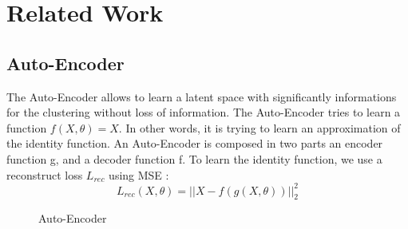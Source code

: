 \section{Related Work}\label{sec:related}

\subsection{Auto-Encoder}
The Auto-Encoder allows to learn a latent space with significantly
informations for the clustering without loss of information.
The Auto-Encoder tries to learn a function $f (X, \theta) = X$. In
other words, it is trying to learn an approximation of the identity
function. An Auto-Encoder is composed in two parts an encoder function
g, and a decoder function f. To learn the identity function, we use a
reconstruct loss $L_{rec}$ using MSE :
\begin{equation*}
  L_{rec}(X, \theta) = || X - f(g(X, \theta)) ||_2^2 
\end{equation*}

\begin{figure}[!h]
  \centering
  
  \caption{Auto-Encoder}
  \label{fig:AE}
\end{figure}
